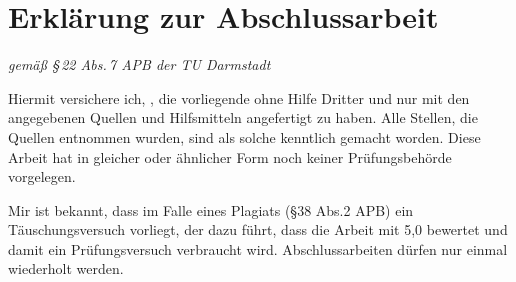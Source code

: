 

%
%
%
%
%

 \chapter*{Erklärung zur Abschlussarbeit}
\begin{flushright}
	\emph{gemäß §\,22 Abs.\,7 APB der TU Darmstadt}
\end{flushright}
Hiermit versichere ich, \myName{}, die vorliegende \myDegree{} ohne Hilfe Dritter und nur mit den angegebenen Quellen und Hilfsmitteln angefertigt zu haben. Alle Stellen, die Quellen entnommen wurden, sind als solche kenntlich gemacht worden. Diese Arbeit hat in gleicher oder ähnlicher Form noch keiner Prüfungsbehörde vorgelegen.

Mir ist bekannt, dass im Falle eines Plagiats (§38 Abs.2 APB) ein Täuschungsversuch vorliegt, der dazu führt, dass die Arbeit mit 5,0 bewertet und damit ein Prüfungsversuch verbraucht wird. Abschlussarbeiten dürfen nur einmal wiederholt werden.

